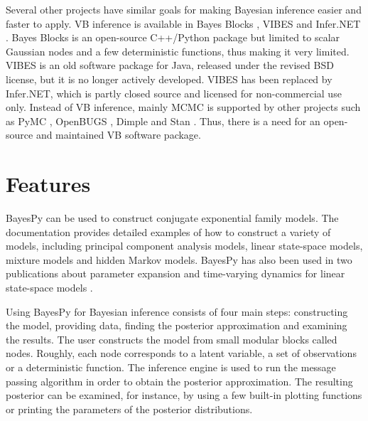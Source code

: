 \documentclass[twoside,11pt]{article}
\begin{document}
Several other projects have similar goals for making Bayesian inference easier
and faster to apply.  VB inference is available in Bayes Blocks
\citep{Raiko:2007}, VIBES \citep{Bishop:2002} and Infer.NET \citep{Infer.NET}.
Bayes Blocks is an open-source C++/Python package but limited to scalar Gaussian
nodes and a few deterministic functions, thus making it very limited.  VIBES is
an old software package for Java, released under the revised BSD license, but it
is no longer actively developed.  VIBES has been replaced by Infer.NET, which
is partly closed source and licensed for non-commercial use only.  Instead of VB
inference, mainly MCMC is supported by other projects such as PyMC \citep{PyMC},
OpenBUGS \citep{OpenBUGS}, Dimple \citep{Dimple} and Stan \citep{Stan}.  Thus,
there is a need for an open-source and maintained VB software package.



\section{Features}


BayesPy can be used to construct conjugate exponential family models.  The
documentation provides detailed examples of how to construct a variety of
models, including principal component analysis models, linear state-space
models, mixture models and hidden Markov models.  BayesPy has also been used in
two publications about parameter expansion and time-varying dynamics for linear
state-space models \citep{Luttinen:2013,Luttinen:2014}.



Using BayesPy for Bayesian inference consists of four main steps: constructing
the model, providing data, finding the posterior approximation and examining the
results.  The user constructs the model from small modular blocks called nodes.
Roughly, each node corresponds to a latent variable, a set of observations or a
deterministic function.
The inference engine is used to run the message passing algorithm in order to
obtain the posterior approximation.  The resulting posterior can be examined,
for instance, by using a few built-in plotting functions or printing the
parameters of the posterior distributions.
\end{document}
